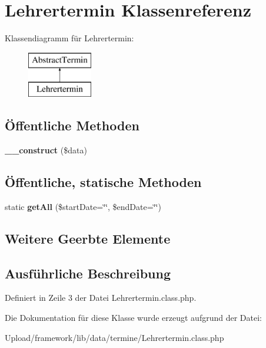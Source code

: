 \hypertarget{class_lehrertermin}{}\section{Lehrertermin Klassenreferenz}
\label{class_lehrertermin}
Klassendiagramm für Lehrertermin\+:\begin{figure}[H]
\begin{center}
\leavevmode
\includegraphics[height=2.000000cm]{class_lehrertermin}
\end{center}
\end{figure}
\subsection*{Öffentliche Methoden}
\begin{DoxyCompactItemize}
\item 
\mbox{\label{class_lehrertermin_a819bd17a0b285a4d814a513c690b5e43}} 
{\bfseries \+\_\+\+\_\+construct} (\$data)
\end{DoxyCompactItemize}
\subsection*{Öffentliche, statische Methoden}
\begin{DoxyCompactItemize}
\item 
\mbox{\label{class_lehrertermin_a9e27d3f9ab5ab7e5ef1b6b0e798dbde9}} 
static {\bfseries get\+All} (\$start\+Date=\char`\"{}\char`\"{}, \$end\+Date=\char`\"{}\char`\"{})
\end{DoxyCompactItemize}
\subsection*{Weitere Geerbte Elemente}


\subsection{Ausführliche Beschreibung}


Definiert in Zeile 3 der Datei Lehrertermin.\+class.\+php.



Die Dokumentation für diese Klasse wurde erzeugt aufgrund der Datei\+:\begin{DoxyCompactItemize}
\item 
Upload/framework/lib/data/termine/Lehrertermin.\+class.\+php\end{DoxyCompactItemize}
